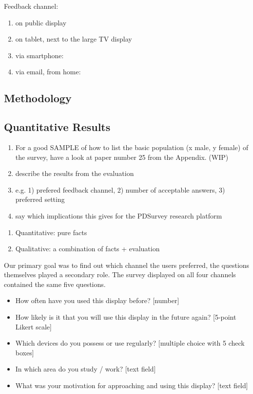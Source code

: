 	Feedback channel: 
	\begin{enumerate}
	\item on public display
	\item on tablet, next to the large TV display
	\item via smartphone: 
	\item via email, from home:
	\end{enumerate}


\subsection{Methodology}





\subsection{Quantitative Results}

	\begin{enumerate}
	\item For a good SAMPLE of how to list the basic population (x male, y female) of the survey, have a look at paper number 25 from the Appendix. (WIP)
	\item describe the results from the evaluation
	\item e.g. 1) prefered feedback channel, 2) number of acceptable answers, 3) preferred setting
	\item say which implications this gives for the PDSurvey research platform
	\end{enumerate}

	\begin{enumerate}
	\item Quantitative: pure facts
	\item Qualitative: a combination of facts + evaluation
	\end{enumerate}


	Our primary goal was to find out which channel the users preferred, the questions themselves played a secondary role. The survey displayed on all four channels contained the same five questions. 

	\begin{itemize}
	\item How often have you used this display before? [number]
	\item How likely is it that you will use this display in the future again? [5-point Likert scale]
	\item Which devices do you possess or use regularly? [multiple choice with 5 check boxes]
	\item In which area do you study / work? [text field]
	\item What was your motivation for approaching and using this display? [text field]
	\end{itemize}

